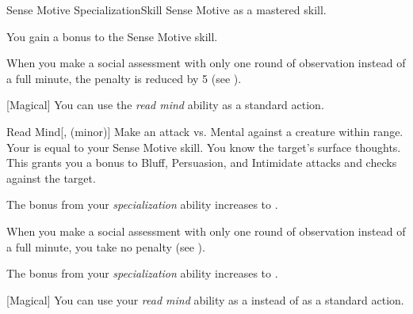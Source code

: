     \begin{feat}{Sense Motive Specialization}{Skill}
        \featpre Sense Motive as a mastered skill.

         You gain a  bonus to the Sense Motive skill.

         When you make a social assessment with only one round of observation instead of a full minute, the penalty is reduced by 5 (see ).

        [Magical] You can use the \textit{read mind} ability as a standard action.
        \begin{apability}{Read Mind}[,  (minor)]
            Make an attack vs. Mental against a creature within \rngclose range.
            Your  is equal to your Sense Motive skill.
            \hit You know the target's surface thoughts.
            This grants you a  bonus to Bluff, Persuasion, and Intimidate attacks and checks against the target.
        \end{apability}

         The bonus from your \textit{specialization} ability increases to .

         When you make a social assessment with only one round of observation instead of a full minute, you take no penalty (see ).

         The bonus from your \textit{specialization} ability increases to .

        [Magical] You can use your \textit{read mind} ability as a  instead of as a standard action.
    \end{feat}

